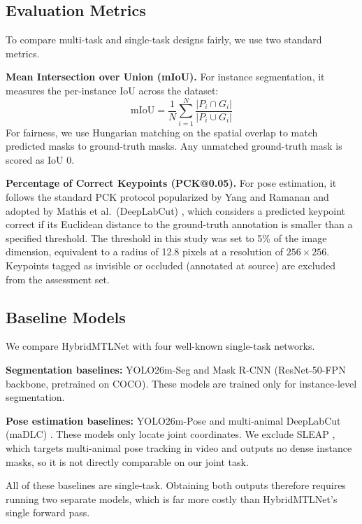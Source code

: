 \documentclass[runningheads]{llncs}
\begin{document}
\subsection{Evaluation Metrics}
To compare multi-task and single-task designs fairly, we use two
standard metrics.

\noindent\textbf{Mean Intersection over Union (mIoU).}
For instance segmentation, it measures the per-instance IoU across
the dataset:
\begin{equation}
  \text{mIoU} = \frac{1}{N}\sum_{i=1}^{N}
  \frac{|P_i \cap G_i|}{|P_i \cup G_i|}
\end{equation}
For fairness, we use Hungarian matching on the spatial overlap to
match predicted masks to ground-truth masks. Any unmatched
ground-truth mask is scored as IoU 0.

\noindent\textbf{Percentage of Correct Keypoints (PCK@0.05).}
For pose estimation, it follows the standard PCK protocol
popularized by Yang and Ramanan \cite{yang2011pck} and adopted by Mathis et al.\
(DeepLabCut) \cite{mathis2018deeplabcut}, which considers a predicted
keypoint correct if its Euclidean distance to the ground-truth
annotation is smaller than a specified threshold. The threshold in
this study was set to 5\% of the image dimension, equivalent to a
radius of 12.8 pixels at a resolution of $256 \times 256$. Keypoints
tagged as invisible or occluded (annotated at source) are excluded
from the assessment set.

\subsection{Baseline Models}
We compare HybridMTLNet with four well-known single-task networks.

\noindent\textbf{Segmentation baselines:} YOLO26m-Seg
\cite{jocher2026yolo26} and Mask R-CNN \cite{he2017maskrcnn}
(ResNet-50-FPN backbone, pretrained on COCO). These models are trained
only for instance-level segmentation.

\noindent\textbf{Pose estimation baselines:} YOLO26m-Pose
\cite{jocher2026yolo26} and multi-animal DeepLabCut (maDLC)
\cite{mathis2018deeplabcut}. These models only locate joint
coordinates. We exclude SLEAP \cite{pereira2022sleap}, which targets
multi-animal pose tracking in video and outputs no dense instance
masks, so it is not directly comparable on our joint task.

All of these baselines are single-task. Obtaining both outputs
therefore requires running two separate models, which is far more
costly than HybridMTLNet's single forward pass.
\end{document}
